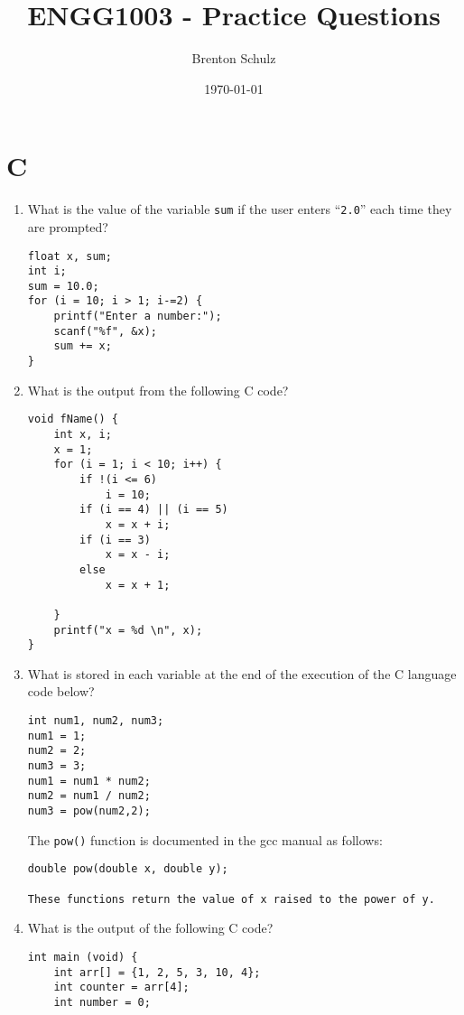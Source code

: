 \documentclass{lab}
\title{ENGG1003 - Practice Questions}
\author{Brenton Schulz}
\date{\today}
\begin{document}
\maketitle

\section{C}

\begin{enumerate}
\item What is the value of the variable \texttt{sum} if the user enters ``\texttt{2.0}'' each time they are prompted?
\begin{lstlisting}[style=CStyle]
float x, sum;
int i;
sum = 10.0;
for (i = 10; i > 1; i-=2) {
	printf("Enter a number:");
	scanf("%f", &x);
	sum += x;
}
\end{lstlisting}

\item What is the output from the following C code?

\begin{lstlisting}[style=CStyle]
void fName() {
	int x, i;
	x = 1;
	for (i = 1; i < 10; i++) {
		if !(i <= 6)
			i = 10;
		if (i == 4) || (i == 5)
			x = x + i;
		if (i == 3)
			x = x - i;
		else
			x = x + 1;

	}
	printf("x = %d \n", x);
}
\end{lstlisting}

\item What is stored in each variable at
the end of the execution of the C language code below?

\begin{lstlisting}[style=CStyle]
int num1, num2, num3;
num1 = 1;
num2 = 2;
num3 = 3;
num1 = num1 * num2;
num2 = num1 / num2;
num3 = pow(num2,2);
\end{lstlisting}

The \texttt{pow()} function is documented in the gcc manual as follows:

\begin{lstlisting}[style=pseudo]
double pow(double x, double y);

These functions return the value of x raised to the power of y.
\end{lstlisting}

\pagebreak
\item What is the output of the following C code?

\begin{lstlisting}[style=CStyle]
int main (void) {
	int arr[] = {1, 2, 5, 3, 10, 4};
	int counter = arr[4];
	int number = 0;
	

\end{lstlisting}
\end{enumerate}
\end{document}
